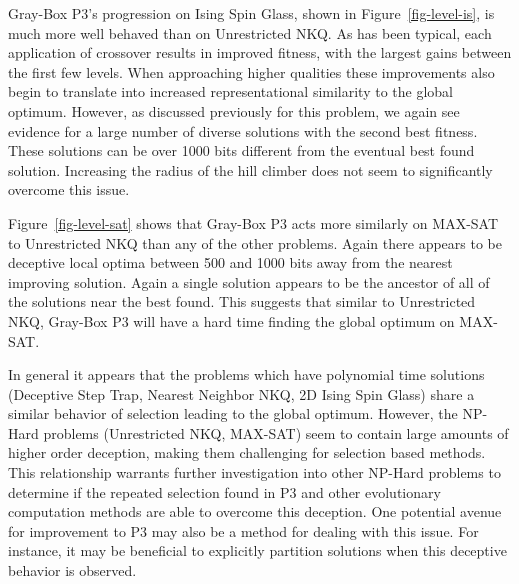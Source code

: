 \begin{figure*}
  \centering
  \caption{Distribution of local optima stored at each level of Gray-Box P3 in relation to the best found by the run on an Ising Spin Glass
           $N=6084$.}
  \label{fig-level-is}
\end{figure*}

Gray-Box P3's progression on Ising Spin Glass, shown in Figure~\ref{fig-level-is}, is much more well behaved than on Unrestricted
NKQ. As has been typical, each application of crossover results in improved fitness, with the largest gains between the first few levels.
When approaching higher qualities these improvements also begin to translate into increased representational similarity to the global optimum.
However, as discussed previously for this problem, we again see evidence for a large number of diverse solutions with the second best
fitness. These solutions can be over 1000 bits different from the eventual best found solution. Increasing the radius of the hill climber
does not seem to significantly overcome this issue.

\begin{figure*}
  \centering
  \caption{Distribution of local optima stored at each level of Gray-Box P3 in relation to the best found by the run on
           a MAX-SAT problem $N=6000$.}
  \label{fig-level-sat}
\end{figure*}

Figure~\ref{fig-level-sat} shows that Gray-Box P3 acts more similarly on MAX-SAT to Unrestricted NKQ than any of the other problems. Again there
appears to be deceptive local optima between 500 and 1000 bits away from the nearest improving solution. Again a single solution appears
to be the ancestor of all of the solutions near the best found. This suggests that similar to Unrestricted NKQ, Gray-Box P3 will have a
hard time finding the global optimum on MAX-SAT.

In general it appears that the problems which have polynomial time solutions (Deceptive Step Trap, Nearest Neighbor NKQ, 2D Ising Spin Glass)
share a similar behavior of selection leading to the global optimum. However, the NP-Hard problems (Unrestricted NKQ, MAX-SAT) seem to contain
large amounts of higher order deception, making them challenging for selection based methods. This relationship warrants further investigation
into other NP-Hard problems to determine if the repeated selection found in P3 and other evolutionary computation methods are able to overcome
this deception. One potential avenue for improvement to P3 may also be a method for dealing with this issue. For instance, it may be beneficial to
explicitly partition solutions when this deceptive behavior is observed.

